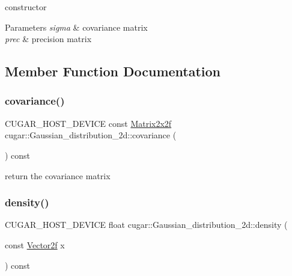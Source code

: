 constructor


\begin{DoxyParams}{Parameters}
{\em sigma} & covariance matrix \\
\hline
{\em prec} & precision matrix \\
\hline
\end{DoxyParams}


\subsection{Member Function Documentation}
\mbox{\label{structcugar_1_1_gaussian__distribution__2d_adb453934ce1db8c170a2e783449241c1}} 
\subsubsection{\texorpdfstring{covariance()}{covariance()}}
{\footnotesize\ttfamily C\+U\+G\+A\+R\+\_\+\+H\+O\+S\+T\+\_\+\+D\+E\+V\+I\+CE const \hyperlink{structcugar_1_1_matrix}{Matrix2x2f} cugar\+::\+Gaussian\+\_\+distribution\+\_\+2d\+::covariance (\begin{DoxyParamCaption}{ }\end{DoxyParamCaption}) const\hspace{0.3cm}{\ttfamily [inline]}}

return the covariance matrix \mbox{\label{structcugar_1_1_gaussian__distribution__2d_a001503b87c988e4cfddbf8814f83a93b}} 
\subsubsection{\texorpdfstring{density()}{density()}}
{\footnotesize\ttfamily C\+U\+G\+A\+R\+\_\+\+H\+O\+S\+T\+\_\+\+D\+E\+V\+I\+CE float cugar\+::\+Gaussian\+\_\+distribution\+\_\+2d\+::density (\begin{DoxyParamCaption}\item[{const \hyperlink{structcugar_1_1_vector}{Vector2f}}]{x }\end{DoxyParamCaption}) const\hspace{0.3cm}{\ttfamily [inline]}}

